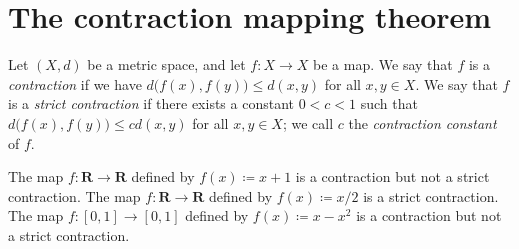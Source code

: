 \section{The contraction mapping theorem}\label{sec 6.6}

\begin{definition}[Contraction]\label{6.6.1}
    Let \((X, d)\) be a metric space, and let \(f : X \to X\) be a map.
    We say that \(f\) is a \emph{contraction} if we have \(d\big(f(x), f(y)\big) \leq d(x, y)\) for all \(x, y \in X\).
    We say that \(f\) is a \emph{strict contraction} if there exists a constant \(0 < c < 1\) such that \(d\big(f(x), f(y)\big) \leq c d(x, y)\) for all \(x, y \in X\);
    we call \(c\) the \emph{contraction constant} of \(f\).
\end{definition}

\begin{example}\label{6.6.2}
    The map \(f : \mathbf{R} \to \mathbf{R}\) defined by \(f(x) \coloneqq x + 1\) is a contraction but not a strict contraction.
    The map \(f : \mathbf{R} \to \mathbf{R}\) defined by \(f(x) \coloneqq x / 2\) is a strict contraction.
    The map \(f : [0, 1] \to [0, 1]\) defined by \(f(x) \coloneqq x - x^2\) is a contraction but not a strict contraction.
\end{example}

